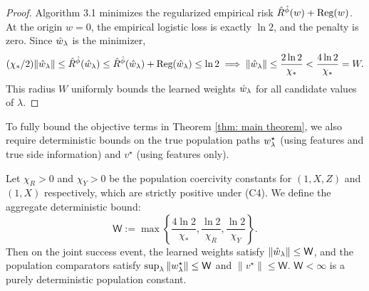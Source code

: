 \begin{proof}
 Algorithm 3.1 minimizes the regularized empirical risk $\hat{R}^{\hat{\phi}}(w) + \text{Reg}(w)$. At the origin $w = 0$, the empirical logistic loss is exactly $\ln 2$, and the penalty is zero. Since $\hat{w}_\lambda$ is the minimizer,
 \begin{equation*}
     (\chi_* / 2)\lVert\hat{w}_\lambda\rVert \le \hat{R}^{\hat{\phi}}(\hat{w}_\lambda) \le \hat{R}^{\hat{\phi}}(\hat{w}_\lambda) + \text{Reg}(\hat{w}_\lambda) \le \ln 2 \implies \lVert\hat{w}_\lambda\rVert \le \frac{2\ln 2}{\chi_*} < \frac{4\ln 2}{\chi_*} = W.
 \end{equation*}
 This radius $W$ uniformly bounds the learned weights $\hat{w}_\lambda$ for all candidate values of $\lambda$.
 \end{proof}
 
 To fully bound the objective terms in Theorem \ref{thm: main theorem}, we also require deterministic bounds on the true population paths $w^\star_{\lambda}$ (using features and true side information) and $v^\star$ (using features only).
 
 \begin{prop}\label{cor: uniform bound on weights}
 Let $\chi_R > 0$ and $\chi_Y > 0$ be the population coercivity constants for $(1,X,Z)$ and $(1,X)$ respectively, which are strictly positive under (C4). We define the aggregate deterministic bound:
 \begin{equation*}
    \mathsf{W} := \max\left\{\frac{4\ln 2}{\chi_*}, \frac{\ln 2}{\chi_R}, \frac{\ln 2}{\chi_Y}\right\}.
 \end{equation*}
 Then on the joint success event, the learned weights satisfy $\|\hat{w}_\lambda\| \le \mathsf{W}$, and the population comparators satisfy $\sup_\lambda \|w^\star_{\lambda}\| \le \mathsf{W}$ and $\|v^\star\| \le \mathsf{W}$. $\mathsf{W} < \infty$ is a purely deterministic population constant.
 \end{prop}


